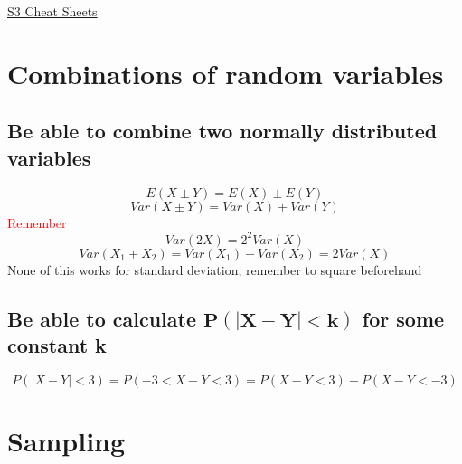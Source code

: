 \documentclass{article}[18pt]
\begin{document}
\begin{center}
\underline{\huge S3 Cheat Sheets}
\end{center}
\section{Combinations of random variables}
\subsection{Be able to combine two normally distributed variables}
$$E(X\pm Y)=E(X)\pm E(Y)$$
$$Var(X\pm Y)=Var(X)+Var(Y)$$
\textcolor{red}{Remember}
$$Var(2X)=2^2Var(X)$$
$$Var(X_1+X_2)=Var(X_1)+Var(X_2)=2Var(X)$$
None of this works for standard deviation, remember to square beforehand
\subsection{Be able to calculate $\mathbf{P(|X-Y|<k)}$ for some constant k}
$$P(|X-Y|<3)=P(-3<X-Y<3)=P(X-Y<3)-P(X-Y<-3)$$
\section{Sampling}
\end{document}
